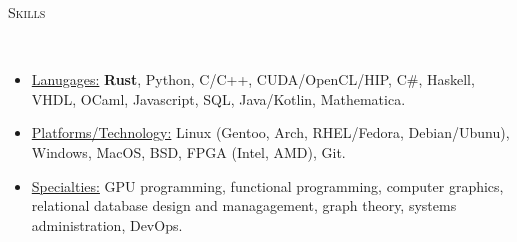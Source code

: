 \documentclass[9pt]{article}
\newenvironment{changemargin}[2]{%
  \begin{list}{}{%
    \setlength{\topsep}{0pt}%
    \setlength{\leftmargin}{#1}%
    \setlength{\rightmargin}{#2}%
    \setlength{\listparindent}{\parindent}%
    \setlength{\itemindent}{\parindent}%
    \setlength{\parsep}{\parskip}%
  }%
  \item[]}{\end{list}
}
\newcommand{\lineover}{
	\begin{changemargin}{-0.05in}{-0.05in}
		\vspace*{-8pt}
		\hrulefill \\
		\vspace*{-2pt}
	\end{changemargin}
}
\newcommand{\header}[1]{
	\begin{changemargin}{-0.5in}{-0.5in}
		\scshape{#1}\\
  	\lineover
	\end{changemargin}
}
\newenvironment{body} {
	\vspace*{-16pt}
	\begin{changemargin}{-0.25in}{-0.5in}
  }	
	{\end{changemargin}
}
\begin{document}
\smallskip

\header{Skills}
\smallskip
\begin{body}
	\vspace{14pt}
	\begin{itemize} \itemsep -0pt

		\item \uline{Lanugages:} \textbf{Rust}, Python, C/C++, CUDA/OpenCL/HIP, C\#, Haskell, VHDL, OCaml, Javascript, SQL, Java/Kotlin, Mathematica.

		\item \uline{Platforms/Technology:} Linux (Gentoo, Arch, RHEL/Fedora,
		Debian/Ubunu), Windows, MacOS,
		      BSD, FPGA (Intel, AMD), Git.
		\item \uline{Specialties:} GPU programming, functional programming, computer graphics, relational database design and managagement, graph theory, systems administration, DevOps.
	\end{itemize}
\end{body}
\end{document}
